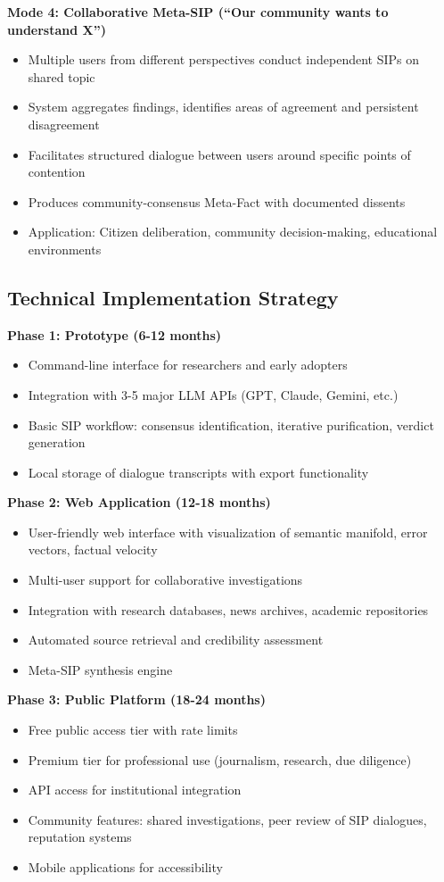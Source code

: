 \documentclass[11pt,a4paper]{article}
\begin{document}
\textbf{Mode 4: Collaborative Meta-SIP (``Our community wants to understand X'')}
\begin{itemize}[nosep]
    \item Multiple users from different perspectives conduct independent SIPs on shared topic
    \item System aggregates findings, identifies areas of agreement and persistent disagreement
    \item Facilitates structured dialogue between users around specific points of contention
    \item Produces community-consensus Meta-Fact with documented dissents
    \item Application: Citizen deliberation, community decision-making, educational environments
\end{itemize}

\subsection{Technical Implementation Strategy}

\textbf{Phase 1: Prototype (6-12 months)}
\begin{itemize}[nosep]
    \item Command-line interface for researchers and early adopters
    \item Integration with 3-5 major LLM APIs (GPT, Claude, Gemini, etc.)
    \item Basic SIP workflow: consensus identification, iterative purification, verdict generation
    \item Local storage of dialogue transcripts with export functionality
\end{itemize}

\textbf{Phase 2: Web Application (12-18 months)}
\begin{itemize}[nosep]
    \item User-friendly web interface with visualization of semantic manifold, error vectors, factual velocity
    \item Multi-user support for collaborative investigations
    \item Integration with research databases, news archives, academic repositories
    \item Automated source retrieval and credibility assessment
    \item Meta-SIP synthesis engine
\end{itemize}

\textbf{Phase 3: Public Platform (18-24 months)}
\begin{itemize}[nosep]
    \item Free public access tier with rate limits
    \item Premium tier for professional use (journalism, research, due diligence)
    \item API access for institutional integration
    \item Community features: shared investigations, peer review of SIP dialogues, reputation systems
    \item Mobile applications for accessibility
\end{itemize}
\end{document}
